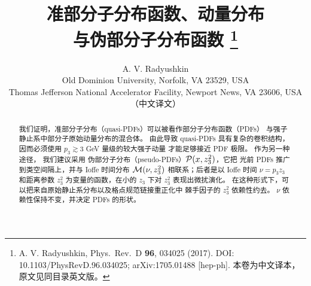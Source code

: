 \documentclass[11pt]{ctexart}
\title{准部分子分布函数、动量分布\\与伪部分子分布函数%
\thanks{A. V. Radyushkin, Phys.\ Rev.\ D {\bf 96}, 034025 (2017).
DOI: 10.1103/PhysRevD.96.034025;
arXiv:1705.01488 [hep-ph]. 本卷为中文译本，原文见同目录英文版。}}
\author{A. V. Radyushkin\\[2pt]
\normalsize Old Dominion University, Norfolk, VA 23529, USA\\
\normalsize Thomas Jefferson National Accelerator Facility,
Newport News, VA 23606, USA\\[4pt]
\normalsize （中文译文）}
\date{}
\begin{document}
\maketitle

\begin{abstract}
我们证明，准部分子分布（quasi-PDFs）可以被看作部分子分布函数（PDFs）
与强子静止系中部分子原始动量分布的混合体。
由此导致 quasi-PDFs 具有复杂的卷积结构，
因而必须使用 $p_3 \gtrsim 3$ GeV 量级的较大强子动量
才能足够接近 PDF 极限。
作为另一种途径，
我们建议采用
伪部分子分布（pseudo-PDFs）${\cal P}(x, z_3^2)$，它把
光前 PDFs 推广到类空间隔上，并与 Ioffe 时间分布
${\cal M} (\nu, z_3^2)$ 相联系；后者是以 Ioffe 时间 $\nu = p_3 z_3$
和距离参数 $z_3^2$ 为变量的函数，在小的 $z_3$ 下对 $z_3^2$
表现出微扰演化。
在这种形式下，可以把来自原始静止系分布以及格点规范链接重正化中
棘手因子的 $z_3^2$ 依赖性约去。
$\nu$ 依赖性保持不变，并决定 PDFs 的形状。
\end{abstract}






\end{document}

